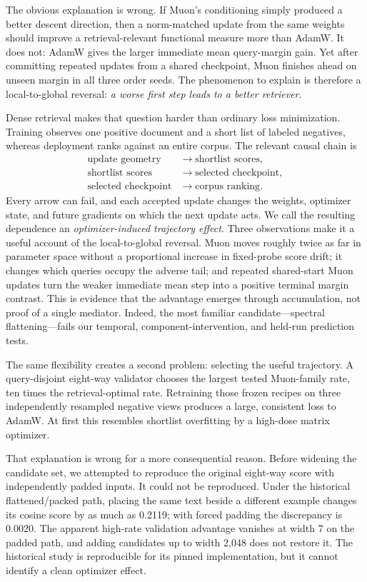 \documentclass[11pt]{article}
\begin{document}
The obvious explanation is wrong. If Muon's conditioning simply produced a better descent
direction, then a norm-matched update from the same weights should improve a retrieval-relevant
functional measure more than AdamW. It does not: AdamW gives the larger immediate mean query-margin
gain. Yet after committing repeated updates from a shared checkpoint, Muon finishes ahead on unseen
margin in all three order seeds. The phenomenon to explain is therefore a local-to-global reversal:
\emph{a worse first step leads to a better retriever}.

Dense retrieval makes that question harder than ordinary loss minimization. Training observes one
positive document and a short list of labeled negatives, whereas deployment ranks against an entire
corpus. The relevant causal chain is
\begin{align*}
\text{update geometry} &\longrightarrow \text{shortlist scores}, \\
\text{shortlist scores} &\longrightarrow \text{selected checkpoint}, \\
\text{selected checkpoint} &\longrightarrow \text{corpus ranking}.
\end{align*}
Every arrow can fail, and each accepted update changes the weights, optimizer state, and future
gradients on which the next update acts. We call the resulting dependence an
\emph{optimizer-induced trajectory effect}. Three observations make it a useful account of the
local-to-global reversal. Muon moves roughly twice as far in parameter space without a proportional
increase in fixed-probe score drift; it changes which queries occupy the adverse tail; and repeated
shared-start Muon updates turn the weaker immediate mean step into a positive terminal margin
contrast. This is evidence that the advantage emerges through accumulation, not proof of a single
mediator. Indeed, the most familiar candidate---spectral flattening---fails our temporal,
component-intervention, and held-run prediction tests.

The same flexibility creates a second problem: selecting the useful trajectory. A query-disjoint
eight-way validator chooses the largest tested Muon-family rate, ten times the retrieval-optimal
rate. Retraining those frozen recipes on three independently resampled negative views produces a
large, consistent loss to AdamW. At first this resembles shortlist overfitting by a high-dose matrix
optimizer.

That explanation is wrong for a more consequential reason. Before widening the candidate set, we
attempted to reproduce the original eight-way score with independently padded inputs. It could not
be reproduced. Under the historical flattened/packed path, placing the same text beside a different
example changes its cosine score by as much as 0.2119; with forced padding the discrepancy is
0.0020. The apparent high-rate validation advantage vanishes at width 7 on the padded path, and
adding candidates up to width 2,048 does not restore it. The historical study is reproducible for
its pinned implementation, but it cannot identify a clean optimizer effect.
\end{document}
